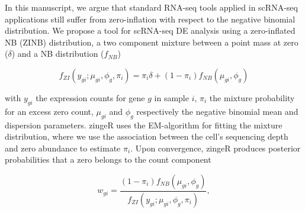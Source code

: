 \documentclass{bmcart}
\begin{document}
In this manuscript, we argue that standard RNA-seq tools applied in scRNA-seq applications still suffer from zero-inflation with respect to the negative binomial distribution.
We propose a tool for scRNA-seq DE analysis using a zero-inflated NB (ZINB) distribution, a two component mixture between a point mass at zero ($\delta$) and a NB distribution ($f_{NB}$)

\[ f_{ZI}(y_{gi}; \mu_{gi}, \phi_g, \pi_i) = \pi_i\delta + (1-\pi_i)f_{NB}(\mu_{gi},\phi_g) \]

with $y_{gi}$ the expression counts for gene $g$ in sample $i$, $\pi_i$ the mixture probability for an excess zero count, $\mu_{gi}$ and $\phi_g$ respectively the negative binomial mean and dispersion parameters.
zingeR uses the EM-algorithm for fitting the mixture distribution, where we use the association between the cell's sequencing depth and zero abundance to estimate $\pi_i$.
Upon convergence, zingeR produces posterior probabilities that a zero belongs to the count component

\begin{equation} \label{eq:weights}
w_{gi}=\frac{(1-\pi_i)f_{NB}(\mu_{gi},\phi_g)}{f_{ZI}(y_{gi}; \mu_{gi}, \phi_g, \pi_i)},
\end{equation}
\end{document}
